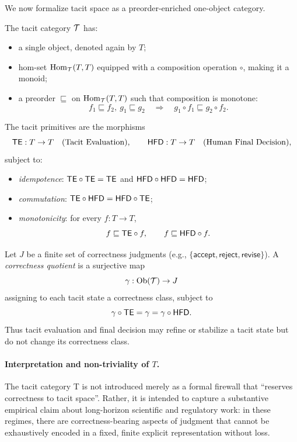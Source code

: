 We now formalize tacit space as a preorder-enriched one-object category.

\begin{definition}
The tacit category \(\mathcal{T}\) has:
\begin{itemize}
  \item a single object, denoted again by \(T\);
  \item hom-set \(\mathrm{Hom}_{\mathcal{T}}(T,T)\) equipped with a composition
        operation \(\circ\), making it a monoid;
  \item a preorder \(\sqsubseteq\) on \(\mathrm{Hom}_{\mathcal{T}}(T,T)\) such that
        composition is monotone:
        \[
        f_1 \sqsubseteq f_2,\ g_1 \sqsubseteq g_2
        \quad\Rightarrow\quad
        g_1 \circ f_1 \sqsubseteq g_2 \circ f_2.
        \]
\end{itemize}
\end{definition}

\begin{definition}
The tacit primitives are the morphisms
\[
\mathsf{TE} : T \to T \quad\text{(Tacit Evaluation)},\qquad
\mathsf{HFD} : T \to T \quad\text{(Human Final Decision)},
\]
subject to:
\begin{itemize}
  \item \emph{idempotence}:
        \(\mathsf{TE} \circ \mathsf{TE} = \mathsf{TE}\) and \(\mathsf{HFD} \circ \mathsf{HFD} = \mathsf{HFD}\);
  \item \emph{commutation}:
        \(\mathsf{TE} \circ \mathsf{HFD} = \mathsf{HFD} \circ \mathsf{TE}\);
  \item \emph{monotonicity}: for every \(f : T \to T\),
        \[
        f \sqsubseteq \mathsf{TE} \circ f,\qquad
        f \sqsubseteq \mathsf{HFD} \circ f.
        \]
\end{itemize}
\end{definition}

\begin{definition}
Let \(J\) be a finite set of correctness judgments
(e.g., \(\{\mathsf{accept}, \mathsf{reject}, \mathsf{revise}\}\)).
A \emph{correctness quotient} is a surjective map
\[
\gamma : \mathrm{Ob}(\mathcal{T}) \to J
\]
assigning to each tacit state a correctness class, subject to
\[
\gamma \circ \mathsf{TE} = \gamma = \gamma \circ \mathsf{HFD}.
\]
Thus tacit evaluation and final decision may refine or stabilize a tacit
state but do not change its correctness class.
\end{definition}

\paragraph{Interpretation and non-triviality of \texorpdfstring{$T$}{T}.}
The tacit category T is not introduced merely as a formal firewall that “reserves correctness to tacit space”.
Rather, it is intended to capture a substantive empirical claim about long-horizon scientific and regulatory work:
in these regimes, there are correctness-bearing aspects of judgment that cannot be exhaustively encoded in a fixed,
finite explicit representation without loss.

